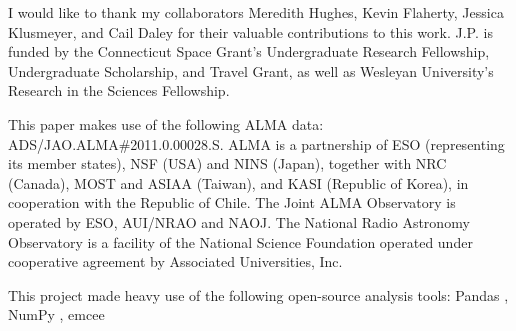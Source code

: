 

\bigskip
\bigskip
\bigskip

I would like to thank my collaborators Meredith Hughes, Kevin Flaherty, Jessica Klusmeyer, and Cail Daley for their valuable contributions to this work. J.P. is funded by the Connecticut Space Grant's Undergraduate Research Fellowship, Undergraduate Scholarship, and Travel Grant, as well as Wesleyan University’s Research in the Sciences Fellowship.

This paper makes use of the following ALMA data: ADS/JAO.ALMA\#2011.0.00028.S. ALMA is a partnership of ESO (representing its member states), NSF (USA) and NINS (Japan), together with NRC (Canada), MOST and ASIAA (Taiwan), and KASI (Republic of Korea), in cooperation with the Republic of Chile. The Joint ALMA Observatory is operated by ESO, AUI/NRAO and NAOJ. The National Radio Astronomy Observatory is a facility of the National Science Foundation operated under cooperative agreement by Associated Universities, Inc.


This project made heavy use of the following open-source analysis tools: Pandas \citep{McKinney2010,McKinney2011}, NumPy \citep{VanDerWalt2011}, emcee \citep{ForemanMackey2013}
